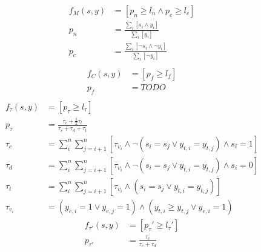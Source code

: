 \documentclass[dissertation.tex]{subfiles}
\begin{document}
\begin{align*}
f_M(s, y) &= \left[ p_n \geq l_n \wedge p_c \geq l_c \right] \\
p_n &= \frac{\sum_i{\left[ s_i \wedge y_i \right]}}{\sum_i{\left[ y_i \right]}} \\
p_c &= \frac{\sum_i{\left[ \neg s_i \wedge \neg y_i \right]}}{\sum_i{\left[ \neg y_i \right]}} \\
\end{align*}
\begin{align*}
f_C(s, y) &= \left[ p_f \geq l_f \right] \\
p_f &= TODO \\
\end{align*}
\begin{align*}
f_{\tau}(s, y) &= \left[ p_\tau \geq l_\tau \right] \\
p_\tau &= \frac{\tau_c + \frac{1}{2}\tau_t}{\tau_c + \tau_d + \tau_t} \\
\tau_c &= \sum_i^n{\sum_{j=i+1}^n{\left[\tau_v_i \wedge \neg \left(s_i = s_j \vee y_{t,i} = y_{t,j}\right) \wedge s_i = 1 \right]}} \\
\tau_d &= \sum_i^n{\sum_{j=i+1}^n{\left[\tau_v_i \wedge \neg \left(s_i = s_j \vee y_{t,i} = y_{t,j}\right) \wedge s_i = 0 \right]}} \\
\tau_t &= \sum_i^n{\sum_{j=i+1}^n{\left[\tau_v_i \wedge \left(s_i = s_j \vee y_{t,i} = y_{t,j}\right)\right]}} \\
\tau_v_i &= \left(y_{e,i} = 1 \vee y_{e,j} = 1\right) \wedge \left(y_{t,i} \geq y_{t,j} \vee y_{e,i} = 1 \right) 
\end{align*}
\begin{align*}
f_{\tau'}(s, y) &= \left[ p_\tau' \geq l_\tau' \right] \\
p_{\tau'} &= \frac{\tau_c}{\tau_c + \tau_d}
\end{align*}
\end{document}
